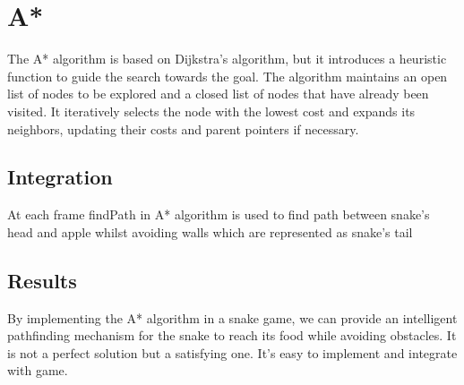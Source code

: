 \section{A*}
\label{sec:astar}

The A* algorithm is based on Dijkstra's algorithm, but it introduces a heuristic function to guide the search towards the goal. The algorithm maintains an open list of nodes to be explored and a closed list of nodes that have already been visited. It iteratively selects the node with the lowest cost and expands its neighbors, updating their costs and parent pointers if necessary.

\subsection{Integration}

At each frame findPath in A* algorithm is used to find path between snake's head and apple whilst avoiding walls which are represented as snake's tail

\subsection{Results}

By implementing the A* algorithm in a snake game, we can provide an intelligent pathfinding mechanism for the snake to reach its food while avoiding obstacles. It is not a perfect solution but a satisfying one. It's easy to implement and integrate with game.

